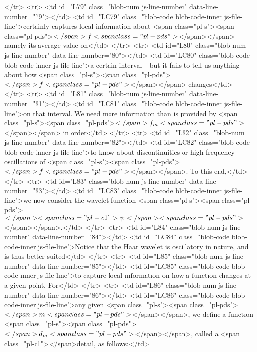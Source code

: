       </tr>
      <tr>
        <td id="L79" class="blob-num js-line-number" data-line-number="79"></td>
        <td id="LC79" class="blob-code blob-code-inner js-file-line">certainly captures local information about <span class="pl-s"><span class="pl-pds">$</span>f<span class="pl-pds">$</span></span> -- namely its average value on</td>
      </tr>
      <tr>
        <td id="L80" class="blob-num js-line-number" data-line-number="80"></td>
        <td id="LC80" class="blob-code blob-code-inner js-file-line">a certain interval -- but it fails to tell us anything about how <span class="pl-s"><span class="pl-pds">$</span>f<span class="pl-pds">$</span></span> changes</td>
      </tr>
      <tr>
        <td id="L81" class="blob-num js-line-number" data-line-number="81"></td>
        <td id="LC81" class="blob-code blob-code-inner js-file-line">on that interval. We need more information than is provided by <span class="pl-s"><span class="pl-pds">$</span>f_m<span class="pl-pds">$</span></span> in order</td>
      </tr>
      <tr>
        <td id="L82" class="blob-num js-line-number" data-line-number="82"></td>
        <td id="LC82" class="blob-code blob-code-inner js-file-line">to know about discontinuities or high-frequency oscillations of <span class="pl-s"><span class="pl-pds">$</span>f<span class="pl-pds">$</span></span>. To this end,</td>
      </tr>
      <tr>
        <td id="L83" class="blob-num js-line-number" data-line-number="83"></td>
        <td id="LC83" class="blob-code blob-code-inner js-file-line">we now consider the wavelet function <span class="pl-s"><span class="pl-pds">$</span><span class="pl-c1">\psi</span><span class="pl-pds">$</span></span>.</td>
      </tr>
      <tr>
        <td id="L84" class="blob-num js-line-number" data-line-number="84"></td>
        <td id="LC84" class="blob-code blob-code-inner js-file-line">Notice that the Haar wavelet is oscillatory in nature, and is thus better suited</td>
      </tr>
      <tr>
        <td id="L85" class="blob-num js-line-number" data-line-number="85"></td>
        <td id="LC85" class="blob-code blob-code-inner js-file-line">to capture local information on how a function changes at a given point. For</td>
      </tr>
      <tr>
        <td id="L86" class="blob-num js-line-number" data-line-number="86"></td>
        <td id="LC86" class="blob-code blob-code-inner js-file-line">any given <span class="pl-s"><span class="pl-pds">$</span>m<span class="pl-pds">$</span></span>, we define a function <span class="pl-s"><span class="pl-pds">$</span>d_m<span class="pl-pds">$</span></span>, called a <span class="pl-c1">\emph</span>{detail}, as follows:</td>
